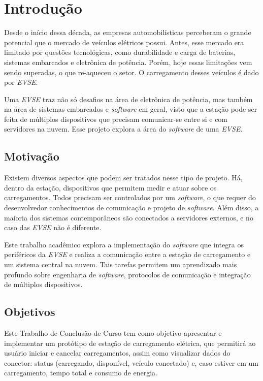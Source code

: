 \chapter{Introdução}
\label{stateofart:intro}

  Desde o início dessa década, as empresas automobilísticas perceberam o grande potencial que o mercado de veículos elétricos possui. Antes, esse mercado era limitado por questões tecnológicas, como durabilidade e carga de baterias,  sistemas embarcados e eletrônica de potência. Porém, hoje essas limitações vem sendo superadas, o que re-aqueceu o setor. O carregamento desses veículos é dado por \textit{\ac{EVSE}}.

  Uma \textit{\ac{EVSE}} traz não só desafios na área de eletrônica de potência, mas também na área de sistemas embarcados e \textit{software} em geral, visto que a estação pode ser feita de múltiplos dispositivos que precisam comunicar-se entre si e com servidores na nuvem. Esse projeto explora a área do \textit{software} de uma \textit{\ac{EVSE}}.

  \section{Motivação}
  \label{stateofart:intro:motivation}

    Existem diversos aspectos que podem ser tratados nesse tipo de projeto. Há, dentro da estação, dispositivos que permitem medir e atuar sobre os carregamentos. Todos precisam ser controlados por um \textit{software}, o que requer do desenvolvedor conhecimentos de comunicação e projeto de \textit{software}. Além disso, a maioria dos sistemas contemporâneos são conectados a servidores externos, e no caso das \textit{\ac{EVSE}} não é diferente.

    Este trabalho acadêmico explora a implementação do \textit{software} que integra os periféricos da \textit{\ac{EVSE}} e realiza a comunicação entre a estação de carregamento e um sistema central na nuvem. Tais tarefas permitem um aprendizado mais profundo sobre engenharia de \textit{software}, protocolos de comunicação e integração de múltiplos dispositivos.

  \section{Objetivos}
  \label{stateofart:intro:objectives}

    Este Trabalho de Conclusão de Curso tem como objetivo apresentar e implementar um protótipo de estação de carregamento elétrica, que permitirá ao usuário iniciar e cancelar carregamentos, assim como visualizar dados do conector: status (carregando, disponível, veículo conectado) e, caso estiver em um carregamento, tempo total e consumo de energia.

